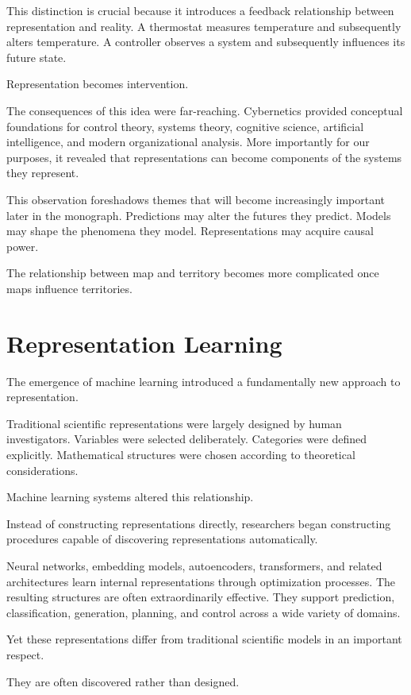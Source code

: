 \documentclass[11pt,oneside,openany]{book}
\begin{document}
This distinction is crucial because it introduces a feedback relationship between representation and reality. A thermostat measures temperature and subsequently alters temperature. A controller observes a system and subsequently influences its future state.

Representation becomes intervention.

The consequences of this idea were far-reaching. Cybernetics provided conceptual foundations for control theory, systems theory, cognitive science, artificial intelligence, and modern organizational analysis. More importantly for our purposes, it revealed that representations can become components of the systems they represent.

This observation foreshadows themes that will become increasingly important later in the monograph. Predictions may alter the futures they predict. Models may shape the phenomena they model. Representations may acquire causal power.

The relationship between map and territory becomes more complicated once maps influence territories.

\section{Representation Learning}

The emergence of machine learning introduced a fundamentally new approach to representation.

Traditional scientific representations were largely designed by human investigators. Variables were selected deliberately. Categories were defined explicitly. Mathematical structures were chosen according to theoretical considerations.

Machine learning systems altered this relationship.

Instead of constructing representations directly, researchers began constructing procedures capable of discovering representations automatically.

Neural networks, embedding models, autoencoders, transformers, and related architectures learn internal representations through optimization processes. The resulting structures are often extraordinarily effective. They support prediction, classification, generation, planning, and control across a wide variety of domains.

Yet these representations differ from traditional scientific models in an important respect.

They are often discovered rather than designed.
\end{document}

